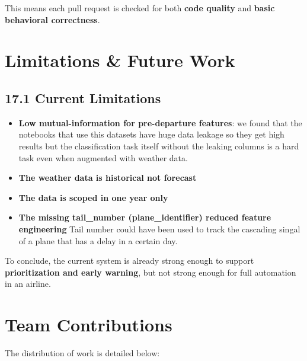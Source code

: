 \documentclass{article}
\begin{document}
This means each pull request is checked for both \textbf{code quality} and \textbf{basic behavioral correctness}. 


\section{\textcolor{accentblue}{Limitations \& Future Work}}


\subsection*{\textcolor{accentgold}{17.1 Current Limitations}}

\begin{itemize}[label=\textcolor{accentblue}{\textbullet}]
    \item \textbf{Low mutual-information for pre-departure features}: we found that the notebooks that use this datasets have huge data leakage so they get high results but the classification task itself without the leaking columns is a hard task even when augmented with weather data.
    \item \textbf{The weather data is historical not forecast}
    \item \textbf{The data is scoped in one year only}
    \item \textbf{The missing tail\_number (plane\_identifier) reduced feature engineering} Tail number could have been used to track the cascading singal of a plane that has a delay in a certain day.
\end{itemize}


To conclude, the current system is already strong enough to support \textbf{prioritization and early warning}, but not strong enough for full automation in an airline.
\section{\textcolor{accentblue}{Team Contributions}}

The distribution of work is detailed below:
\end{document}
